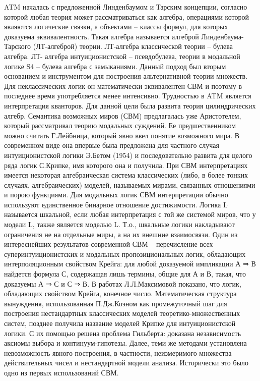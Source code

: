 \documentclass[12pt, a4paper]{article}
\begin{document}
ATM началась с предложенной Линденбаумом и Тарским концепции, согласно которой любая теория
может рассматриваться как алгебра, операциями которой являются логические связки, а объектами –
классы формул, для которых доказуема эквивалентность. Такая алгебра называется алгеброй
Линденбаума-Тарского (ЛТ-алгеброй) теории. ЛТ-алгебра классической теории – булева алгебра. ЛТ-
алгебра интуиционистской – псевдобулева, теории в модальной логике S4 – булева алгебра с
замыканиями. Данный подход был вторым основанием и инструментом для построения альтернативной
теории множеств. Для неклассических логик он математически эквивалентен СВМ и поэтому в
последнее время употребляется менее интенсивно. Трудностью в ATM является интерпретация
кванторов. Для данной цели была развита теория цилиндрических алгебр.
Семантика возможных миров (СВМ) предлагалась уже Аристотелем, который рассматривал теорию
модальных суждений. Ее предшественником можно считать Г.Лейбница, который явно ввел понятие
возможного мира. В современном виде она впервые была предложена для частного случая
интуиционистской логики Э.Бетом (1954) и последовательно развита для целого ряда логик
С.Крипке, имя которого она и получила.
При СВМ интерпретациях имеется некоторая алгебраическая система классических (либо, в более
тонких случаях, алгебраических) моделей, называемых мирами, связанных отношениями и порою
функциями. Для модальных логик СВМ интерпретации обычно используют единственное бинарное
отношение достижимости.
Логика L называется шкальной, если любая интерпретация с той же системой миров, что у модели L,
также является моделью L. Т.о., шкальные логики накладывают ограничения не на отдельные миры, а
на их внешние взаимосвязи.
Один из интереснейших результатов современной СВМ – перечисление всех суперинтуиционистских и
модальных пропозициональных логик, обладающих интерполяционным свойством Крейга: для любой
доказуемой импликации А ⇒ В найдется формула С, содержащая лишь термины, общие для А и В,
такая, что доказуемы А ⇒ С и С ⇒ В. В работах Л.Л.Максимовой показано, что логик, обладающих
свойством Крейга, конечное число.
Математическая структура вынуждения, использованная П.Дж.Коэном как промежуточный шаг для
построения нестандартных классических моделей теоретико-множественных систем, позднее получила
название моделей Крипке для интуиционистской логики. С их помощью решена проблема
Гильберта: доказана независимость аксиомы выбора и континуум-гипотезы. Далее, теми же методами
установлена невозможность явного построения, в частности, неизмеримого множества действительных
чисел и нестандартной модели анализа. Исторически это было одно из первых использований СВМ.
\end{document}
